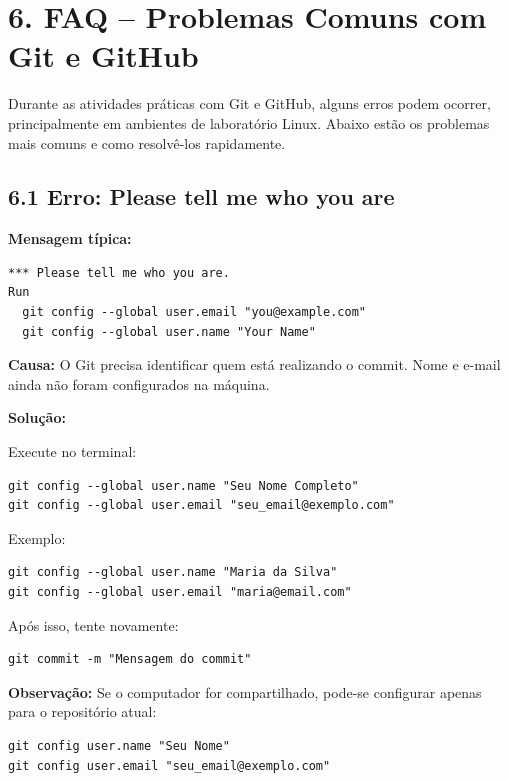 \documentclass[12pt,a4paper]{article}
\begin{document}
    
\section*{6. FAQ – Problemas Comuns com Git e GitHub}

Durante as atividades práticas com Git e GitHub, alguns erros podem ocorrer, principalmente em ambientes de laboratório Linux. Abaixo estão os problemas mais comuns e como resolvê-los rapidamente.

\subsection*{6.1 Erro: Please tell me who you are}

\textbf{Mensagem típica:}

\begin{verbatim}
*** Please tell me who you are.
Run
  git config --global user.email "you@example.com"
  git config --global user.name "Your Name"
\end{verbatim}

\textbf{Causa:}  
O Git precisa identificar quem está realizando o commit. Nome e e-mail ainda não foram configurados na máquina.

\textbf{Solução:}

Execute no terminal:

\begin{verbatim}
git config --global user.name "Seu Nome Completo"
git config --global user.email "seu_email@exemplo.com"
\end{verbatim}

Exemplo:

\begin{verbatim}
git config --global user.name "Maria da Silva"
git config --global user.email "maria@email.com"
\end{verbatim}

Após isso, tente novamente:

\begin{verbatim}
git commit -m "Mensagem do commit"
\end{verbatim}

\textbf{Observação:}  
Se o computador for compartilhado, pode-se configurar apenas para o repositório atual:

\begin{verbatim}
git config user.name "Seu Nome"
git config user.email "seu_email@exemplo.com"
\end{verbatim}
\end{document}

